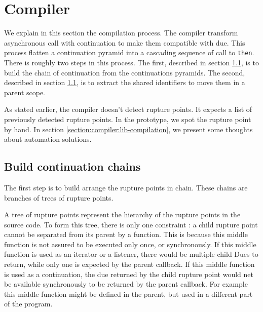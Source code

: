 \section{Compiler} \label{section:compiler}

We explain in this section the compilation process.
The compiler transform asynchronous call with continuation to make them compatible with due.
This process flatten a continuation pyramid into a cascading sequence of call to \texttt{then}.
There is roughly two steps in this process.
The first, described in section \ref{section:compiler:chain}, is to build the chain of continuation from the continuations pyramids.
The second, described in section \ref{section:compiler:chain}, is to extract the shared identifiers to move them in a parent scope.

As stated earlier, the compiler doesn't detect rupture points.
It expects a list of previously detected rupture points.
In the prototype, we spot the rupture point by hand.
In section \ref{section:compiler:lib-compilation}, we present some thoughts about automation solutions.

\subsection{Build continuation chains} \label{section:compiler:chain}


The first step is to build arrange the rupture points in chain.
These chains are branches of trees of rupture points.

A tree of rupture points represent the hierarchy of the rupture points in the source code.
To form this tree, there is only one constraint : a child rupture point cannot be separated from its parent by a function.
This is because this middle function is not assured to be executed only once, or synchronously.
If this middle function is used as an iterator or a listener, there would be multiple child Dues to return, while only one is expected by the parent callback.
If this middle function is used as a continuation, the due returned by the child rupture point would net be available synchronously to be returned by the parent callback.
For example this middle function might be defined in the parent, but used in a different part of the program.

